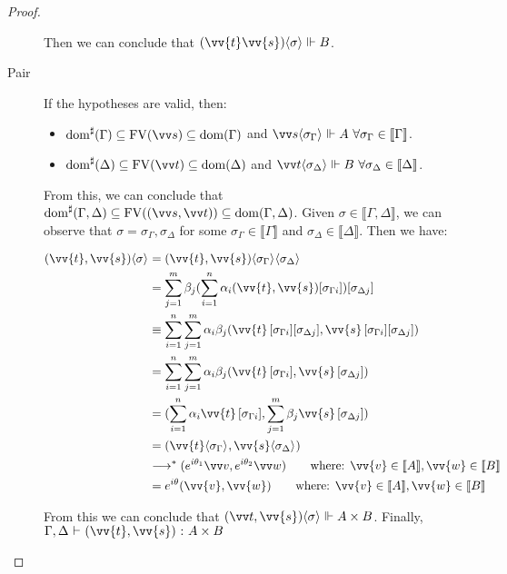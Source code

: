 \documentclass[runningheads,orivec,envcountsame,envcountsect]{llncs}
\newcommand\lra{\longrightarrow}
\newcommand\ansubst[2]{\ensuremath{\langle #1 \rangle_{#2}}}
\newcommand\dom[1]{\mathrm{dom}(#1)}
\newcommand\sdom[1]{\mathrm{dom}^{\sharp}(#1)}
\newcommand\FV[1]{\mathrm{FV}(#1)}
\def\Pair#1#2{(#1,#2)} %
\def\eval{\lra^*}
\def\sem#1{\llbracket#1\rrbracket}
\def\TYP#1#2#3{#1~{\vdash}~#2~{:}~#3}
\def\real{\Vdash}
\begin{document}
\begin{proof}
\begin{description}
    Then we can conclude that $(\vv{t}\vv{s})\ansubst{\sigma}{}\real B$.
    
    \item[Pair] If the hypotheses are valid, then:

    \begin{itemize}
        \item $\sdom{\Gamma}\subseteq \FV{\vv s}\subseteq \dom{\Gamma}$ and $\vv s \ansubst{\sigma_\Gamma}{}\Vdash A\ \forall \sigma_\Gamma\in\sem{\Gamma}$.
        \item $\sdom{\Delta}\subseteq \FV{\vv t}\subseteq \dom{\Delta}$ and $\vv t\ansubst{\sigma_\Delta}{}\Vdash B\ \forall \sigma_\Delta\in\sem{\Delta}$.
    \end{itemize}
    
    From this, we can conclude that $\sdom{\Gamma,\Delta}\subseteq \FV{(\vv s, \vv t)}\subseteq \dom{\Gamma,\Delta}$. Given $\sigma\in\sem{\Gamma,\Delta}$, we can observe that $\sigma=\sigma_\Gamma,\sigma_\Delta$ for some  $\sigma_\Gamma\in\sem{\Gamma}$ and $\sigma_\Delta\in\sem{\Delta}$. Then we have:

    \begin{align*}
        \Pair{\vv{t}}{\vv{s}}\ansubst{\sigma}{} &= \Pair{\vv{t}}{\vv{s}}\ansubst{\sigma_\Gamma}{}\ansubst{\sigma_\Delta}{}\\
        &=\sum_{j=1}^{m} \beta_j (\sum_{i=1}^{n} \alpha_i \Pair{\vv{t}}{\vv{s}}[\sigma_{\Gamma i}])[\sigma_{\Delta j}]\\
        &\equiv\sum_{i=1}^{n}\sum_{j=1}^{m} \alpha_i \beta_j \Pair{\vv{t}\,[\sigma_{\Gamma i}][\sigma_{\Delta j}]}{\vv{s}\,[\sigma_{\Gamma i}][\sigma_{\Delta j}]}\\
        &=\sum_{i=1}^{n}\sum_{j=1}^{m} \alpha_i \beta_j \Pair{\vv{t}\,[\sigma_{\Gamma i}]}{\vv{s}\,[\sigma_{\Delta j}]}\\
        &=\Pair{\sum_{i=1}^{n} \alpha_i \vv{t}\, [\sigma_{\Gamma i}]}{\sum_{j=1}^{m} \beta_j \vv{s}\, [\sigma_{\Delta j}]}\\
        &=\Pair{\vv{t}\ansubst{\sigma_\Gamma}{}}{\vv{s}\ansubst{\sigma_\Delta}{}}\\
        &\eval \Pair{e^{i\theta_1}\vv v}{e^{i\theta_2}\vv w}\qquad\text{where: }\vv{v}\in\sem{A}, \vv{w}\in\sem{B}\\
        &= e^{i\theta} \Pair{\vv{v}}{\vv{w}}\qquad\text{where: }\vv{v}\in\sem{A},\vv{w}\in\sem{B}
    \end{align*}
    
    From this we can conclude that $\Pair{\vv t}{\vv{s}}\ansubst{\sigma}{}\real A\times B$. Finally, $\TYP{\Gamma,\Delta}{\Pair{\vv{t}}{\vv{s}}}{A\times B}$
    

\end{description}
\end{proof}
\end{document}
